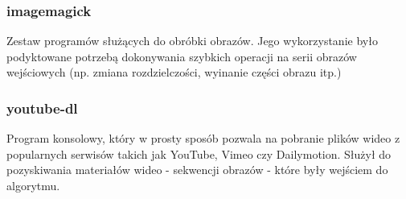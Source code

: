 \subsubsection{imagemagick}
Zestaw programów służących do obróbki obrazów. Jego wykorzystanie było podyktowane potrzebą dokonywania szybkich operacji na serii obrazów wejściowych (np. zmiana rozdzielczości, wyinanie części obrazu itp.)
\subsubsection{youtube-dl}
Program konsolowy, który w prosty sposób pozwala na pobranie plików wideo z popularnych serwisów takich jak YouTube, Vimeo czy Dailymotion. Służył do pozyskiwania materiałów wideo - sekwencji obrazów - które były wejściem do algorytmu.